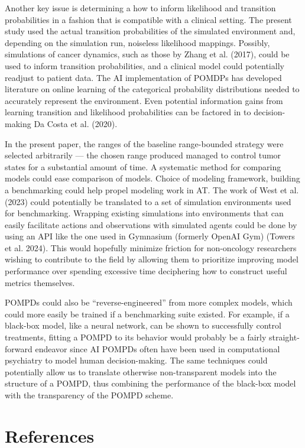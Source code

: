 \documentclass[
]{article}
\begin{document}
Another key issue is determining a how to inform likelihood and
transition probabilities in a fashion that is compatible with a clinical
setting. The present study used the actual transition probabilities of
the simulated environment and, depending on the simulation run,
noiseless likelihood mappings. Possibly, simulations of cancer dynamics,
such as those by Zhang et al. (2017), could be used to inform transition
probabilities, and a clinical model could potentially readjust to
patient data. The AI implementation of POMDPs has developed literature
on online learning of the categorical probability distributions needed
to accurately represent the environment. Even potential information
gains from learning transition and likelihood probabilities can be
factored in to decision-making Da Costa et al. (2020).

In the present paper, the ranges of the baseline range-bounded strategy
were selected arbitrarily --- the chosen range produced managed to
control tumor states for a substantial amount of time. A systematic
method for comparing models could ease comparison of models. Choice of
modeling framework, building a benchmarking could help propel modeling
work in AT. The work of West et al. (2023) could potentially be
translated to a set of simulation environments used for benchmarking.
Wrapping existing simulations into environments that can easily
facilitate actions and observations with simulated agents could be done
by using an API like the one used in Gymnasium (formerly OpenAI Gym)
(Towers et al. 2024). This would hopefully minimize friction for
non-oncology researchers wishing to contribute to the field by allowing
them to prioritize improving model performance over spending excessive
time deciphering how to construct useful metrics themselves.

POMPDs could also be ``reverse-engineered'' from more complex models,
which could more easily be trained if a benchmarking suite existed. For
example, if a black-box model, like a neural network, can be shown to
successfully control treatments, fitting a POMPD to its behavior would
probably be a fairly straight-forward endeavor since AI POMPDs often
have been used in computational psychiatry to model human
decision-making. The same techniques could potentially allow us to
translate otherwise non-transparent models into the structure of a
POMPD, thus combining the performance of the black-box model with the
transparency of the POMPD scheme.

\section{References}\label{references}
\end{document}
